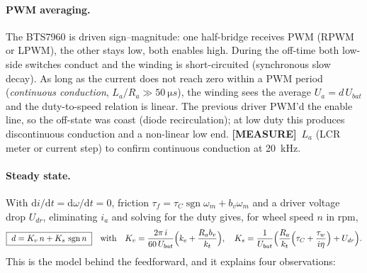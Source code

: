 \documentclass[11pt,a4paper]{article}
\newcommand{\mk}[2]{\textsf{\scriptsize\bfseries\colorbox{#1bg}{\color{#1}[#2]}}}
\newcommand{\MEASURE}{\mk{warn}{MEASURE}}
\newcommand{\sgn}{\operatorname{sgn}}
\begin{document}
\paragraph{PWM averaging.} The BTS7960 is driven sign--magnitude: one half-bridge
receives PWM (RPWM or LPWM), the other stays low, both enables high. During the
off-time both low-side switches conduct and the winding is short-circuited
(synchronous slow decay). As long as the current does not reach zero within a
PWM period (\emph{continuous conduction}, $L_a/R_a\gg\qty{50}{\micro s}$), the
winding sees the average $U_a=d\,U_{bat}$ and the duty-to-speed relation is
linear. The previous driver PWM'd the enable line, so the off-state was coast
(diode recirculation); at low duty this produces discontinuous conduction and a
non-linear low end. \MEASURE\ $L_a$ (LCR meter or current step) to confirm
continuous conduction at \qty{20}{kHz}.

\paragraph{Steady state.} With $\mathrm di/\mathrm dt=\mathrm d\omega/\mathrm dt=0$,
friction $\tau_f=\tau_C\sgn\omega_m+b_v\omega_m$ and a driver voltage drop
$U_{dr}$, eliminating $i_a$ and solving for the duty gives, for wheel speed $n$ in
rpm,
\begin{equation}
\boxed{\;d = K_v\,n + K_s\,\sgn n\;}
\quad\text{with}\quad
K_v=\frac{2\pi\,i}{60\,U_{bat}}\Bigl(k_e+\frac{R_a b_v}{k_t}\Bigr),\quad
K_s=\frac{1}{U_{bat}}\Bigl(\frac{R_a}{k_t}\Bigl(\tau_C+\frac{\tau_w}{i\eta}\Bigr)+U_{dr}\Bigr).
\label{eq:kvks}
\end{equation}
This is the model behind the feedforward, and it explains four observations:
\end{document}
